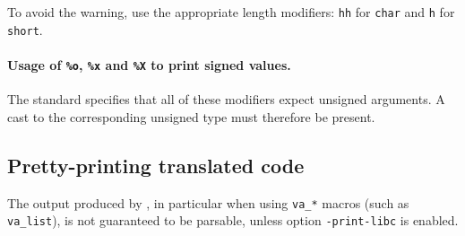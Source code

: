 To avoid the warning, use the appropriate length modifiers:
\verb+hh+ for \verb+char+ and \verb+h+ for \verb+short+.

\paragraph{Usage of \texttt{\%o}, \texttt{\%x} and \texttt{\%X} to print
  signed values.}

The standard specifies that all of these modifiers expect unsigned arguments.
A cast to the corresponding unsigned type must therefore be present.

\subsection{Pretty-printing translated code}

The output produced by , in particular when using
\verb+va_*+ macros (such as \verb+va_list+), is not guaranteed to be
parsable, unless option \verb+-print-libc+ is enabled.
